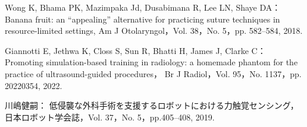 \documentclass[a4paper]{jarticle}
\begin{document}
\begin{thebibliography}{9}
    Wong K, Bhama PK, Mazimpaka Jd, Dusabimana R, Lee LN, Shaye DA：
    Banana fruit: an “appealing” alternative for practicing suture techniques in resource-limited settings, 
    Am J Otolaryngol，Vol. 38，No. 5，pp. 582–584, 2018.

    Giannotti E, Jethwa K, Closs S, Sun R, Bhatti H, James J, Clarke C：
    Promoting simulation-based training in radiology: a homemade phantom for the practice of ultrasound-guided procedures，
    Br J Radiol，Vol. 95，No. 1137，pp. 20220354, 2022.

    川嶋健嗣： 
    低侵襲な外科手術を支援するロボットにおける力触覚センシング，
    日本ロボット学会誌，Vol. 37，No. 5，pp.405–408, 2019.




    

\end{thebibliography}
\end{document}
